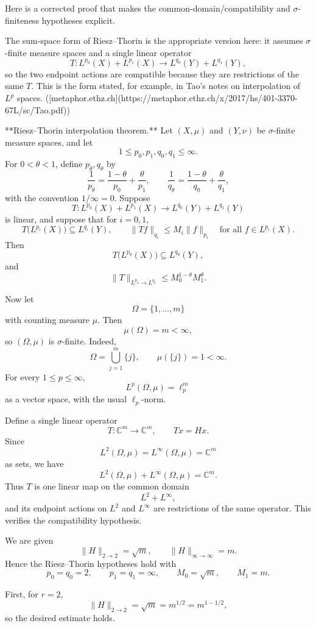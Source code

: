 Here is a corrected proof that makes the common-domain/compatibility and \(\sigma\)-finiteness hypotheses explicit.

The sum-space form of Riesz--Thorin is the appropriate version here: it assumes \(\sigma\)-finite measure spaces and a single linear operator
\[
T:L^{p_0}(X)+L^{p_1}(X)\to L^{q_0}(Y)+L^{q_1}(Y),
\]
so the two endpoint actions are compatible because they are restrictions of the same \(T\). This is the form stated, for example, in Tao’s notes on interpolation of \(L^p\) spaces. ([metaphor.ethz.ch](https://metaphor.ethz.ch/x/2017/hs/401-3370-67L/sc/Tao.pdf))

**Riesz--Thorin interpolation theorem.** Let \((X,\mu)\) and \((Y,\nu)\) be \(\sigma\)-finite measure spaces, and let
\[
1\le p_0,p_1,q_0,q_1\le \infty.
\]
For \(0<\theta<1\), define \(p_\theta,q_\theta\) by
\[
\frac1{p_\theta}
=
\frac{1-\theta}{p_0}
+
\frac{\theta}{p_1},
\qquad
\frac1{q_\theta}
=
\frac{1-\theta}{q_0}
+
\frac{\theta}{q_1},
\]
with the convention \(1/\infty=0\). Suppose
\[
T:L^{p_0}(X)+L^{p_1}(X)\to L^{q_0}(Y)+L^{q_1}(Y)
\]
is linear, and suppose that for \(i=0,1\),
\[
T\bigl(L^{p_i}(X)\bigr)\subseteq L^{q_i}(Y),
\qquad
\|Tf\|_{q_i}\le M_i\|f\|_{p_i}
\quad\text{for all }f\in L^{p_i}(X).
\]
Then
\[
T\bigl(L^{p_\theta}(X)\bigr)\subseteq L^{q_\theta}(Y),
\]
and
\[
\|T\|_{L^{p_\theta}\to L^{q_\theta}}
\le
M_0^{1-\theta}M_1^\theta .
\]

Now let
\[
\Omega=\{1,\dots,m\}
\]
with counting measure \(\mu\). Then
\[
\mu(\Omega)=m<\infty,
\]
so \((\Omega,\mu)\) is \(\sigma\)-finite. Indeed,
\[
\Omega=\bigcup_{j=1}^m \{j\},
\qquad
\mu(\{j\})=1<\infty.
\]
For every \(1\le p\le \infty\),
\[
L^p(\Omega,\mu)=\ell_p^m
\]
as a vector space, with the usual \(\ell_p\)-norm.

Define a single linear operator
\[
T:\mathbb C^m\to \mathbb C^m,
\qquad
Tx=Hx.
\]
Since
\[
L^2(\Omega,\mu)=L^\infty(\Omega,\mu)=\mathbb C^m
\]
as sets, we have
\[
L^2(\Omega,\mu)+L^\infty(\Omega,\mu)=\mathbb C^m.
\]
Thus \(T\) is one linear map on the common domain
\[
L^2+L^\infty,
\]
and its endpoint actions on \(L^2\) and \(L^\infty\) are restrictions of the same operator. This verifies the compatibility hypothesis.

We are given
\[
\|H\|_{2\to 2}=\sqrt m,
\qquad
\|H\|_{\infty\to\infty}=m.
\]
Hence the Riesz--Thorin hypotheses hold with
\[
p_0=q_0=2,
\qquad
p_1=q_1=\infty,
\qquad
M_0=\sqrt m,
\qquad
M_1=m.
\]

First, for \(r=2\),
\[
\|H\|_{2\to 2}
=
\sqrt m
=
m^{1/2}
=
m^{1-1/2},
\]
so the desired estimate holds.

